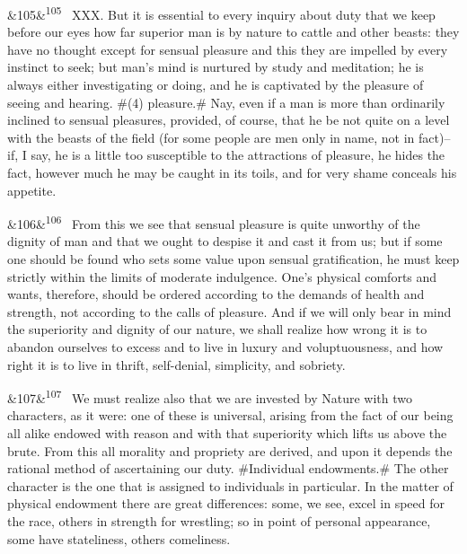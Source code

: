 \documentclass[12pt]{article}
\newcommand{\para}[1][]{\par\noindent\ifx&#1&\else\textsuperscript{\footnotesize #1}~\fi}
\begin{document}
\para[105] XXX. But it is essential to every inquiry about duty that we keep before our eyes how far superior man is by nature to cattle and other beasts: they have no thought except for sensual pleasure and this they are impelled by every instinct to seek; but man's mind is nurtured by study and meditation; he is always either investigating or doing, and he is captivated by the pleasure of seeing and hearing. \#(4) pleasure.\# Nay, even if a man is more than ordinarily inclined to sensual pleasures, provided, of course, that he be not quite on a level with the beasts of the field (for some people are men only in name, not in fact)--if, I say, he is a little too susceptible to the attractions of pleasure, he hides the fact, however much he may be caught in its toils, and for very shame conceals his appetite.

\para[106] From this we see that sensual pleasure is quite unworthy of the dignity of man and that we ought to despise it and cast it from us; but if some one should be found who sets some value upon sensual gratification, he must keep strictly within the limits of moderate indulgence. One's physical comforts and wants, therefore, should be ordered according to the demands of health and strength, not according to the calls of pleasure. And if we will only bear in mind the superiority and dignity of our nature, we shall realize how wrong it is to abandon ourselves to excess and to live in luxury and voluptuousness, and how right it is to live in thrift, self-denial, simplicity, and sobriety.

\para[107] We must realize also that we are invested by Nature with two characters, as it were: one of these is universal, arising from the fact of our being all alike endowed with reason and with that superiority which lifts us above the brute. From this all morality and propriety are derived, and upon it depends the rational method of ascertaining our duty. \#Individual endowments.\# The other character is the one that is assigned to individuals in particular. In the matter of physical endowment there are great differences: some, we see, excel in speed for the race, others in strength for wrestling; so in point of personal appearance, some have stateliness, others comeliness.
\end{document}
